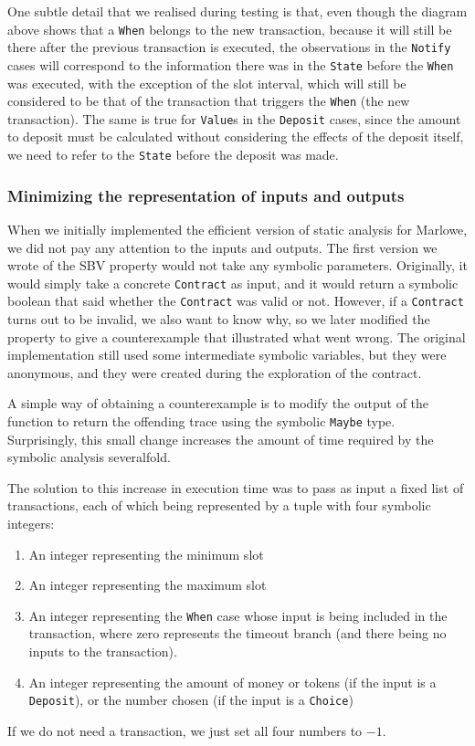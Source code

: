 \documentclass[english,runningheads]{llncs}
\begin{document}
One subtle detail that we realised during testing is that, even though
the diagram above shows that a \texttt{When} belongs to the new transaction,
because it will still be there after the previous transaction is executed,
the observations in the \texttt{Notify} cases will correspond to the
information there was in the \texttt{State} before the \texttt{When}
was executed, with the exception of the slot interval, which will still be
considered to be that of the transaction that triggers the \texttt{When} (the
new transaction). The same is true for \texttt{Value}s in the \texttt{Deposit}
cases, since the amount to deposit must be calculated without considering the
effects of the deposit itself, we need to refer to the \texttt{State} before
the deposit was made.

\subsubsection{Minimizing the representation of inputs and outputs }

When we initially implemented the efficient version of static analysis
for Marlowe, we did not pay any attention to the inputs and outputs.
The first version we wrote of the SBV property would not take any
symbolic parameters. Originally, it would simply take a concrete \texttt{Contract}
as input, and it would return a symbolic boolean that said whether
the \texttt{Contract} was valid or not. However, if a \texttt{Contract}
turns out to be invalid, we also want to know why, so we later modified
the property to give a counterexample that illustrated what went wrong.
The original implementation still used some intermediate symbolic
variables, but they were anonymous, and they were created during the
exploration of the contract.

A simple way of obtaining a counterexample is to modify the output
of the function to return the offending trace using the symbolic \texttt{Maybe}
type. Surprisingly, this small change increases the amount of time
required by the symbolic analysis severalfold.

The solution to this increase in execution time was to pass as input
a fixed list of transactions, each of which being represented by a
tuple with four symbolic integers:
\begin{enumerate}
\item An integer representing the minimum slot
\item An integer representing the maximum slot
\item An integer representing the \texttt{When} case whose input is being
included in the transaction, where zero represents the timeout branch
(and there being no inputs to the transaction).
\item An integer representing the amount of money or tokens (if the input
is a \texttt{Deposit}), or the number chosen (if the input is a \texttt{Choice})
\end{enumerate}
If we do not need a transaction, we just set all four numbers to $-1$.
\end{document}
